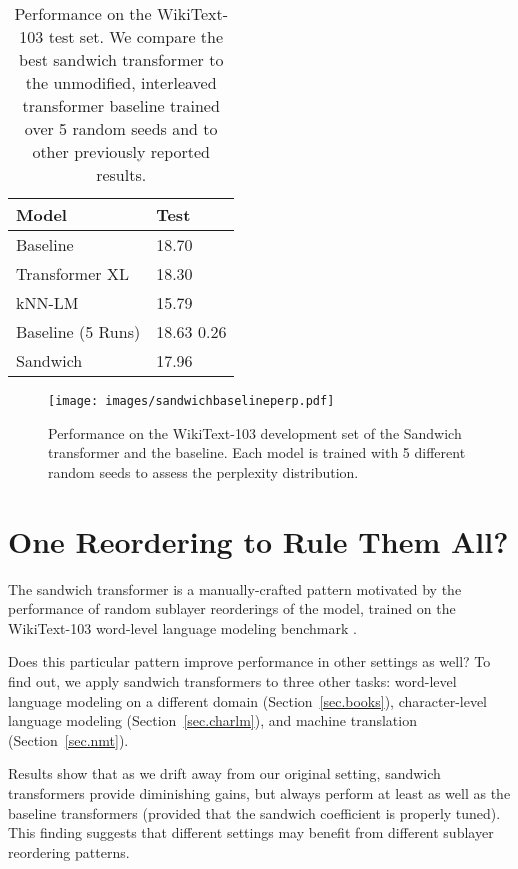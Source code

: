 \documentclass[11pt,a4paper]{article}
\begin{document}
\begin{table}[t]
\centering
\small
\begin{tabular}{@{}ll@{}}
\toprule
\textbf{Model}   
& \textbf{Test}   \\
\midrule
Baseline \cite{baevski2018adaptive} & 18.70 \\
Transformer XL \cite{transformerXL} & 18.30 \\
kNN-LM \cite{urvashi} & 15.79 \\
\midrule
Baseline (5 Runs)  
& 18.63  0.26 \\
Sandwich 
& 17.96 \\
\bottomrule
\end{tabular}
\caption{Performance on the WikiText-103 test set. We compare the best sandwich transformer to the unmodified, interleaved transformer baseline \cite{baevski2018adaptive} trained over 5 random seeds and to other previously reported results.}
\label{tab.sandwichtest}
\end{table}

\begin{figure}[h]
\centering
\texttt{[image: images/sandwichbaselineperp.pdf]}
\caption{Performance on the WikiText-103 development set of the Sandwich transformer and the baseline. Each model is trained with 5 different random seeds to assess the perplexity distribution.}
\label{fig:sandwichdist}
\end{figure}


 \section{One Reordering to Rule Them All?}

The sandwich transformer is a manually-crafted pattern motivated by the performance of random sublayer reorderings of the \citet{baevski2018adaptive} model, trained on the WikiText-103 word-level language modeling benchmark \cite{merity2016pointer}.

Does this particular pattern improve performance in other settings as well?
To find out, we apply sandwich transformers to three other tasks:  word-level language modeling on a different domain (Section~\ref{sec.books}), character-level language modeling (Section~\ref{sec.charlm}), and machine translation (Section~\ref{sec.nmt}). 

Results show that as we drift away from our original setting, sandwich transformers provide diminishing gains, but always perform at least as well as the baseline transformers (provided that the sandwich coefficient is properly tuned).
This finding suggests that different settings may benefit from different sublayer reordering patterns.
\end{document}
